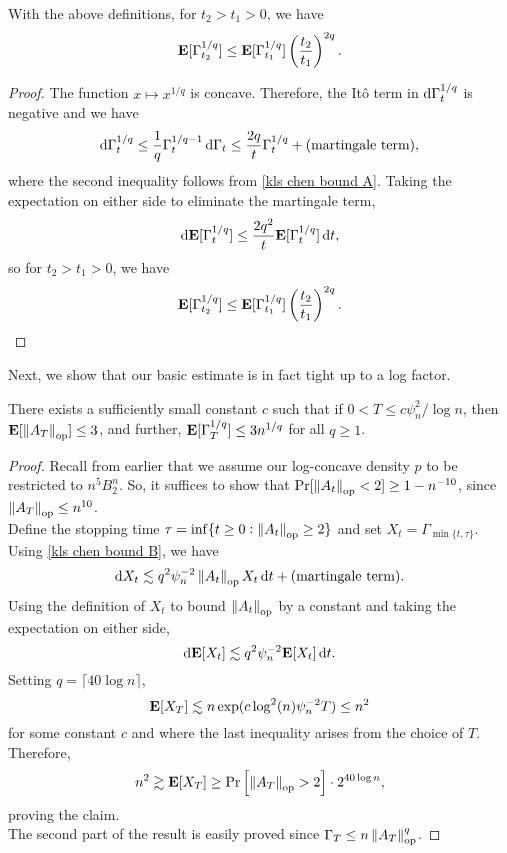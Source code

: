 \documentclass{article}
\begin{document}
		\begin{corollary}
			\label{chen: expectation of potential A}	
			With the above definitions, for $t_2 > t_1 > 0$, we have
			\begin{equation}
				\textbf{E}[\Gamma_{t_2}^{1/q}] \leq \textbf{E}[\Gamma_{t_1}^{1/q}] \left(\frac{t_2}{t_1}\right)^{2q}.	
			\end{equation}
		\end{corollary}
		\begin{proof}
			The function $x \mapsto x^{1/q}$ is concave. Therefore, the It\^{o} term in $\operatorname{d}\!{\Gamma_t^{1/q}}$ is negative and we have
			\[ \operatorname{d}\!{\Gamma_t^{1/q}} \leq \frac{1}{q} \Gamma_t^{1/q-1}\operatorname{d}\!{\Gamma_t} \leq \frac{2q}{t} \Gamma_t^{1/q} + \text{(martingale term)}, \]
			where the second inequality follows from \eqref{kls chen bound A}. Taking the expectation on either side to eliminate the martingale term,
			\[ \operatorname{d}\!{\textbf{E}[\Gamma_t^{1/q}]} \leq \frac{2q^2}{t} \textbf{E}[\Gamma_t^{1/q}]\operatorname{d}\!{t}, \]
			so for $t_2 > t_1 > 0$, we have
			\[ \textbf{E}[\Gamma_{t_2}^{1/q}] \leq \textbf{E}[\Gamma_{t_1}^{1/q}] \left(\frac{t_2}{t_1}\right)^{2q}. \qedhere \]
		\end{proof}

		Next, we show that our basic estimate  is in fact tight up to a log factor.

		\begin{corollary}
			\label{chen: expectation of potential B}
			There exists a sufficiently small constant $c$ such that if $0 < T \leq c \psi_n^2 / \log n$, then $\textbf{E}[\left\lVert A_T\right\rVert_{\text{op}}] \leq 3$, and further, $\textbf{E}[\Gamma_T^{1/q}] \leq 3n^{1/q}$ for all $q \geq 1$.
		\end{corollary}
		\begin{proof}
			Recall from earlier that we assume our log-concave density $p$ to be restricted to $n^5 B_2^n$. So, it suffices to show that $\Pr[\left\lVert A_t\right\rVert_{\text{op}} < 2] \geq 1 - n^{-10}$, since $\left\lVert A_T\right\rVert_{\text{op}} \leq n^{10}$.\\
			Define the stopping time $\tau = \inf\{t \geq 0 : \left\lVert A_t\right\rVert_{\text{op}} \geq 2 \}$ and set $X_t = \Gamma_{\min\{t,\tau\}}$. Using \eqref{kls chen bound B}, we have
			\[ \operatorname{d}\!{X_t} \lesssim q^2\psi_n^{-2}\left\lVert A_t\right\rVert_{\text{op}}X_t\operatorname{d}\!{t} + \text{(martingale term)}. \]
			Using the definition of $X_t$ to bound $\left\lVert A_t\right\rVert_{\text{op}}$ by a constant and taking the expectation on either side,
			\[ \operatorname{d}\!{\textbf{E}[X_t]} \lesssim q^2\psi_n^{-2}\textbf{E}[X_t]\operatorname{d}\!{t}. \]
			Setting $q = \lceil 40 \log n \rceil$,
			\[ \textbf{E}[X_T] \lesssim n \exp(c\log^2 (n)\psi_n^{-2}T) \leq n^2 \]
			for some constant $c$ and where the last inequality arises from the choice of $T$. Therefore,
			\[ n^2 \gtrsim \textbf{E}[X_T] \geq \Pr\left[ \left\lVert A_T\right\rVert_{\text{op}} > 2 \right] \cdot 2^{40 \log n}, \]
			proving the claim.\\
			The second part of the result is easily proved since $\Gamma_T \leq n\left\lVert A_T\right\rVert_{\text{op}}^q$.
		\end{proof}
\end{document}
